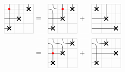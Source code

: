 \documentclass[reqno,12pt]{amsart}
\theoremstyle{definition}
\theoremstyle{remark}
\newcommand\Xmarking[2]
{\draw[very thick] (#1-0.7,#2-0.7)--(#1-0.3,#2-0.3);
\draw[very thick] (#1-0.7,#2-0.3)--(#1-0.3,#2-0.7);
\draw (#1-1,#2-0.5)--(#1-0.5,#2-0.5);
\draw (#1-0.5,#2-0.5)--(#1-0.5,#2); }
\newcommand\Cross[2]
{\draw (#1-0.5,#2)--(#1-0.5,#2-1);
\draw (#1,#2-0.5)--(#1-1,#2-0.5); }
\newcommand\UP[2]{\draw (#1-0.5,#2)--(#1-0.5,#2-1);}
\newcommand\EAST[2]{\draw (#1,#2-0.5)--(#1-1,#2-0.5);}
\newcommand\Asmooth[2]
{\draw (#1,#2-0.5) .. controls (#1-0.45,#2-0.45) and (#1-0.45,#2-0.45) .. (#1-0.5,#2);
\draw (#1-1,#2-0.5) .. controls (#1-0.55,#2-0.55) and (#1-0.55,#2-0.55) .. (#1-0.5,#2-1); }
\begin{document}
\begin{align*}
    \begin{tikzpicture}[scale=0.5]
        \draw[black!20] (0,0) grid (3,3);
        \Xmarking{1}{1}\Xmarking{2}{2}\Xmarking{3}{3}
        \Cross{1}{2}\Cross{1}{3}\Cross{2}{3}
            \node[circle, fill=red, draw=red, scale=0.3] at (0.5,2.5) {};
    \end{tikzpicture}
  &\begin{tikzpicture}[scale=0.5]
        \draw[white!20] (0,0) grid (1,3);
        \node[text width=0.5cm] at (0.5, 1.5) {$=$};
        \end{tikzpicture}
    \begin{tikzpicture}[scale=0.5]
        \draw[black!20] (0,0) grid (3,3);
        \Xmarking{1}{1}\Xmarking{2}{2}\Xmarking{3}{3}
        \Cross{1}{2}\Asmooth{1}{3}\Cross{2}{3}
            \node[circle, fill=red, draw=red, scale=0.3] at (1.5,2.5) {};
    \end{tikzpicture}
    \begin{tikzpicture}[scale=0.5]
        \draw[white!20] (0,0) grid (1,3);
        \node[text width=0.5cm] at (0.5, 1.5) {$+$};
        \end{tikzpicture}
    \begin{tikzpicture}[scale=0.5]
        \draw[black!20] (0,0) grid (3,3);
        \Xmarking{1}{3}\Xmarking{2}{2}\Xmarking{3}{1}
        \UP{2}{3}\EAST{1}{2}\UP{3}{2}\UP{3}{3}\EAST{1}{1}\EAST{2}{1}
    \end{tikzpicture}\\
    &\begin{tikzpicture}[scale=0.5]
        \draw[white!20] (0,0) grid (1,3);
        \node[text width=0.5cm] at (0.5, 1.5) {$=$};
        \end{tikzpicture}\begin{tikzpicture}[scale=0.5]
        \draw[black!20] (0,0) grid (3,3);
        \Xmarking{1}{1}\Xmarking{2}{2}\Xmarking{3}{3}
        \Cross{1}{2}\Asmooth{1}{3}\Asmooth{2}{3}
            \node[circle, fill=red, draw=red, scale=0.3] at (0.5,1.5) {};
    \end{tikzpicture}
        \begin{tikzpicture}[scale=0.5]
        \draw[white!20] (0,0) grid (1,3);
        \node[text width=0.5cm] at (0.5, 1.5) {$+$};
        \end{tikzpicture}
            \begin{tikzpicture}[scale=0.5]
        \draw[black!20] (0,0) grid (3,3);
        \Xmarking{1}{1}\Xmarking{2}{3}\Xmarking{3}{2}
        \Cross{1}{2}\Asmooth{1}{3}\EAST{2}{2}\UP{3}{3}

\end{tikzpicture}
\end{align*}
\end{document}
